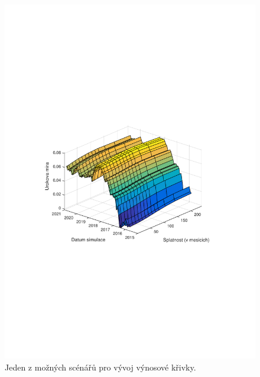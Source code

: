 \documentclass[a4paper,12pt]{report}
\theoremstyle{definition} \newtheorem{definice}[veta]{Definice}
\theoremstyle{remark}
\begin{document}
\begin{figure}[!htbp]
  \centering 
	\includegraphics[width=13cm, clip, trim= 90 270 110 270]{IMG/3D_mira.pdf}
     \caption{Jeden z možných scénářů pro vývoj výnosové křivky.}  \label{YieldCurveEvolution}
\end{figure}
\end{document}
